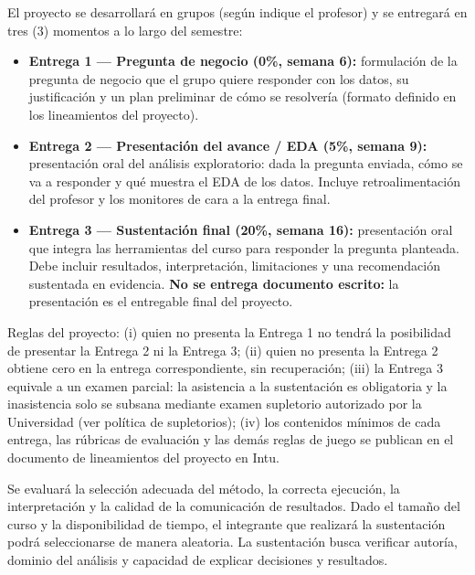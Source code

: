 \documentclass[11pt,a4paper]{article}
\begin{document}
\vspace{0.3cm}

El proyecto se desarrollará en grupos (según indique el profesor) y se entregará en tres (3) momentos a lo largo del semestre:

\begin{itemize}
    \item \textbf{Entrega 1 --- Pregunta de negocio (0\%, semana 6):} formulación de la pregunta de negocio que el grupo quiere responder con los datos, su justificación y un plan preliminar de cómo se resolvería (formato definido en los lineamientos del proyecto).
    \item \textbf{Entrega 2 --- Presentación del avance / EDA (5\%, semana 9):} presentación oral del análisis exploratorio: dada la pregunta enviada, cómo se va a responder y qué muestra el EDA de los datos. Incluye retroalimentación del profesor y los monitores de cara a la entrega final.
    \item \textbf{Entrega 3 --- Sustentación final (20\%, semana 16):} presentación oral que integra las herramientas del curso para responder la pregunta planteada. Debe incluir resultados, interpretación, limitaciones y una recomendación sustentada en evidencia. \textbf{No se entrega documento escrito:} la presentación es el entregable final del proyecto.
\end{itemize}

Reglas del proyecto: (i) quien no presenta la Entrega 1 no tendrá la posibilidad de presentar la Entrega 2 ni la Entrega 3; (ii) quien no presenta la Entrega 2 obtiene cero en la entrega correspondiente, sin recuperación; (iii) la Entrega 3 equivale a un examen parcial: la asistencia a la sustentación es obligatoria y la inasistencia solo se subsana mediante examen supletorio autorizado por la Universidad (ver política de supletorios); (iv) los contenidos mínimos de cada entrega, las rúbricas de evaluación y las demás reglas de juego se publican en el documento de lineamientos del proyecto en Intu.

\vspace{0.3cm}

Se evaluará la selección adecuada del método, la correcta ejecución, la interpretación y la calidad de la comunicación de resultados. Dado el tamaño del curso y la disponibilidad de tiempo, el integrante que realizará la sustentación podrá seleccionarse de manera aleatoria. La sustentación busca verificar autoría, dominio del análisis y capacidad de explicar decisiones y resultados.
\end{document}
